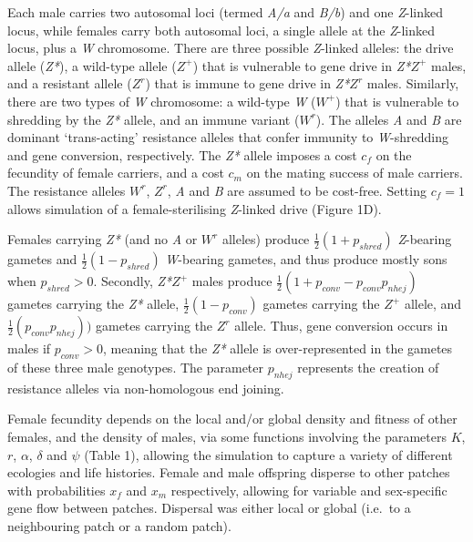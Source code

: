 \documentclass[]{rsos}%
\begin{document}
Each male carries two autosomal loci (termed \emph{A/a} and \emph{B/b})
and one \emph{Z}-linked locus, while females carry both autosomal loci,
a single allele at the \emph{Z}-linked locus, plus a \emph{W}
chromosome. There are three possible \emph{Z}-linked alleles: the drive
allele (\emph{Z*}), a wild-type allele (\(Z^+\)) that is vulnerable to
gene drive in \emph{Z*}\(Z^+\) males, and a resistant allele (\(Z^r\))
that is immune to gene drive in \emph{Z*}\(Z^r\) males. Similarly, there
are two types of \emph{W} chromosome: a wild-type \emph{W} (\(W^+\))
that is vulnerable to shredding by the \emph{Z*} allele, and an immune
variant (\(W^r\)). The alleles \emph{A} and \emph{B} are dominant
`trans-acting' resistance alleles that confer immunity to
\emph{W}-shredding and gene conversion, respectively. The \emph{Z*}
allele imposes a cost \(c_f\) on the fecundity of female carriers, and a
cost \(c_m\) on the mating success of male carriers. The resistance
alleles \(W^r\), \(Z^r\), \emph{A} and \emph{B} are assumed to be
cost-free. Setting \(c_f = 1\) allows simulation of a female-sterilising
\emph{Z}-linked drive (Figure 1D).

Females carrying \emph{Z*} (and no \emph{A} or \(W^r\) alleles) produce
\(\frac{1}{2}(1 + p_{shred})\) \emph{Z}-bearing gametes and
\(\frac{1}{2}(1 - p_{shred})\) \emph{W}-bearing gametes, and thus
produce mostly sons when \(p_{shred} > 0\). Secondly, \emph{Z*}\(Z^+\)
males produce \(\frac{1}{2}(1 + p_{conv} - p_{conv} p_{nhej})\) gametes
carrying the \emph{Z*} allele, \(\frac{1}{2}(1 - p_{conv})\) gametes
carrying the \(Z^+\) allele, and \(\frac{1}{2}(p_{conv} p_{nhej}))\)
gametes carrying the \(Z^r\) allele. Thus, gene conversion occurs in
males if \(p_{conv} > 0\), meaning that the \emph{Z*} allele is
over-represented in the gametes of these three male genotypes. The
parameter \(p_{nhej}\) represents the creation of resistance alleles via
non-homologous end joining.

Female fecundity depends on the local and/or global density and fitness
of other females, and the density of males, via some functions involving
the parameters \(K\), \(r\), \(\alpha\), \(\delta\) and \(\psi\) (Table
1), allowing the simulation to capture a variety of different ecologies
and life histories. Female and male offspring disperse to other patches
with probabilities \(x_f\) and \(x_m\) respectively, allowing for
variable and sex-specific gene flow between patches. Dispersal was
either local or global (i.e.~to a neighbouring patch or a random patch).
\end{document}
